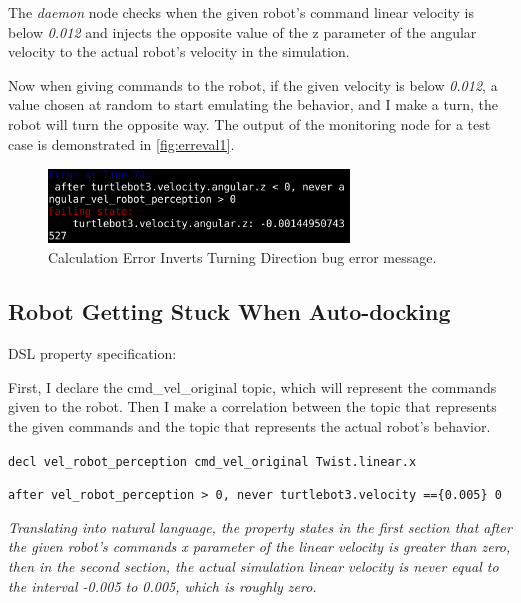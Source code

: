 The \textit{daemon} node checks when the given robot's command linear velocity is below \textit{0.012} and injects the opposite value of the z parameter of the angular velocity to the actual robot's velocity in the simulation.

Now when giving commands to the robot, if the given velocity is below \textit{0.012}, a value chosen at random to start emulating the behavior, and I make a turn, the robot will turn the opposite way. The output of the monitoring node for a test case is demonstrated in \autoref{fig:erreval1}.

\begin{figure}[htb]
\begin{center}
\includegraphics[width=8cm,height=2cm,keepaspectratio,]{images/erreval1.png}
\caption{Calculation Error Inverts Turning Direction bug error message.} \label{fig:erreval1}
\end{center}
\end{figure}


\subsection{Robot Getting Stuck When Auto-docking}
\label{ssec:robotgettingstuckwhenautodocking}

DSL property specification:

First, I declare the cmd\_vel\_original topic, which will represent the commands given to the robot.
Then I make a correlation between the topic that represents the given commands and the topic that represents the actual robot's behavior.

\texttt{decl vel\_robot\_perception cmd\_vel\_original Twist.linear.x}

\texttt{after vel\_robot\_perception > 0, never turtlebot3.velocity ==\{0.005\} 0}

\textit{Translating into natural language, the property states in the first section that after the given robot's commands x parameter of the linear velocity is greater than zero, then in the second section, the actual simulation linear velocity is never equal to the interval -0.005 to 0.005, which is roughly zero.}

